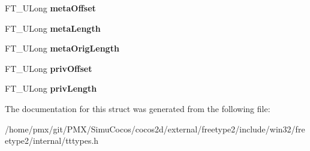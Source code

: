 \begin{DoxyCompactItemize}
F\+T\+\_\+\+U\+Long {\bfseries meta\+Offset}
\item 
\mbox{\label{structWOFF__HeaderRec___a5496776da0752cb2ff133c5068ceb0ab}} 
F\+T\+\_\+\+U\+Long {\bfseries meta\+Length}
\item 
\mbox{\label{structWOFF__HeaderRec___a71ba111d9a0b7139db466f69dc47647f}} 
F\+T\+\_\+\+U\+Long {\bfseries meta\+Orig\+Length}
\item 
\mbox{\label{structWOFF__HeaderRec___a28e0df8dd3d47a13bae3c339c438a0d8}} 
F\+T\+\_\+\+U\+Long {\bfseries priv\+Offset}
\item 
\mbox{\label{structWOFF__HeaderRec___a5b2043f2356a61f1e41cfcd564ca5222}} 
F\+T\+\_\+\+U\+Long {\bfseries priv\+Length}
\end{DoxyCompactItemize}


The documentation for this struct was generated from the following file\+:\begin{DoxyCompactItemize}
\item 
/home/pmx/git/\+P\+M\+X/\+Simu\+Cocos/cocos2d/external/freetype2/include/win32/freetype2/internal/tttypes.\+h\end{DoxyCompactItemize}

